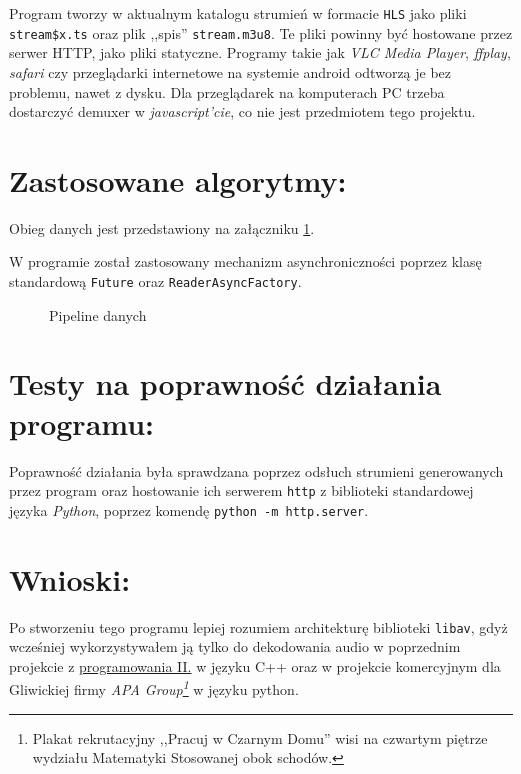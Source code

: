 \documentclass[a4paper,12pt]{article}
\begin{document}
Program tworzy w aktualnym katalogu strumień w formacie \texttt{HLS} jako pliki
\texttt{stream\$x.ts} oraz plik ,,spis'' \texttt{stream.m3u8}. Te pliki powinny
być hostowane przez serwer HTTP, jako pliki statyczne. Programy takie jak
\emph{VLC Media Player}, \emph{ffplay}, \emph{safari} czy przeglądarki
internetowe na systemie android odtworzą je bez problemu, nawet z dysku. Dla
przeglądarek na komputerach PC trzeba dostarczyć demuxer w
\emph{javascript'cie}, co nie jest przedmiotem tego projektu.


\section{Zastosowane algorytmy:}

Obieg danych jest przedstawiony na załączniku \ref{rys:pipeline}.

W programie został zastosowany mechanizm asynchroniczności poprzez klasę
standardową \texttt{Future} oraz \texttt{ReaderAsyncFactory}.

\begin{figure}
    \resizebox{.3\textwidth}{!}{%
    }
    \centering
    \caption{Pipeline danych}
    \label{rys:pipeline}
\end{figure}

\section{Testy na poprawność działania programu:}

Poprawność działania była sprawdzana poprzez odsłuch strumieni generowanych
przez program oraz hostowanie ich serwerem \texttt{http} z biblioteki
standardowej języka \emph{Python}, poprzez komendę \texttt{python -m
http.server}.

\section{Wnioski:}

Po stworzeniu tego programu lepiej rozumiem architekturę biblioteki
\texttt{libav}, gdyż wcześniej wykorzystywałem ją tylko do dekodowania audio w
poprzednim projekcie z
\href{https://github.com/HakierGrzonzo/GrzesSFMLlib}{programowania II.} w języku
C++ oraz w projekcie komercyjnym dla Gliwickiej firmy \emph{APA
Group\footnote{Plakat rekrutacyjny ,,Pracuj w Czarnym Domu'' wisi na czwartym
piętrze wydziału Matematyki Stosowanej obok schodów.}} w języku
python.
\end{document}
